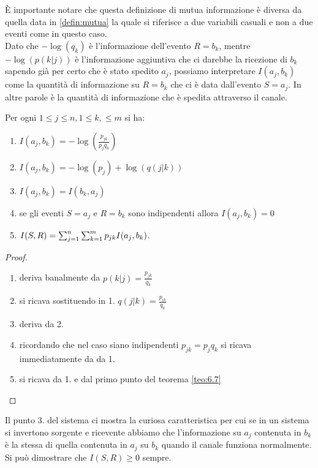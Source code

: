 È importante notare che questa definizione di mutua informazione è diversa da quella data in \ref{defin:mutua} la quale si riferisce a due variabili casuali e non a due eventi come in questo caso.\\
Dato che $- \log(q_k)$ è l'informazione dell'evento $R=b_k$, mentre $- \log(p(k|j))$ è l'informazione aggiuntiva che ci darebbe la ricezione di $b_k$ sapendo già per certo che è stato spedito $a_j$, possiamo interpretare $I(a_j,b_k)$ come la quantità di informazione su $R=b_k$ che ci è data dall'evento $S=a_j$. In altre parole è la quantità di informazione che è spedita attraverso il canale.
\begin{teo} \label{teo:7.1}
Per ogni $1\leq j \leq n , 1 \leq k, \leq m$ si ha:
\begin{enumerate}
\item $I(a_j,b_k)=- \log(\frac{p_{jk}}{p_j q_k})$
\item $I(a_j,b_k)=- \log(p_j)+ \log(q(j|k))$
\item $I(a_j,b_k)=I(b_k,a_j)$
\item se gli eventi $S=a_j$ e $R=b_k$ sono indipendenti allora $I(a_j,b_k)=0$
\item $I(S,R)=\sum_{j=1}^n \sum_{k=1}^m p_{jk}I(a_j,b_k)$.
\end{enumerate}
\end{teo}
\begin{proof}
\begin{enumerate}
\item deriva banalmente da $p(k|j)=\frac{p_{jk}}{q_k}$
\item si ricava sostituendo in 1. $q(j|k)=\frac{p_{ik}}{q_k}$
\item deriva da 2.
\item ricordando che nel caso siano indipendenti $p_{jk}=p_jq_k$ si ricava immediatamente da da 1.
\item si ricava da 1. e dal primo punto del teorema \ref{teo:6.7}
\end{enumerate}
\end{proof}
Il punto 3. del sistema ci mostra la curiosa caratteristica per cui se in un sistema si invertono sorgente e ricevente abbiamo che l'informazione su $a_j$ contenuta in $b_k$ è la stessa di quella contenuta in $a_j$ su $b_k$ quando il canale funziona normalmente. Si può dimostrare che $I(S,R)\geq 0$ sempre.


